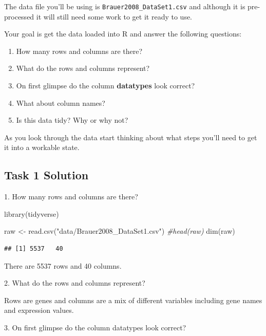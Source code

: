 \documentclass[
]{book}
\newenvironment{Shaded}{\begin{snugshade}}{\end{snugshade}}
\newcommand{\CommentTok}[1]{\textcolor[rgb]{0.56,0.35,0.01}{\textit{#1}}}
\newcommand{\FunctionTok}[1]{\textcolor[rgb]{0.00,0.00,0.00}{#1}}
\newcommand{\NormalTok}[1]{#1}
\newcommand{\OtherTok}[1]{\textcolor[rgb]{0.56,0.35,0.01}{#1}}
\newcommand{\StringTok}[1]{\textcolor[rgb]{0.31,0.60,0.02}{#1}}
\providecommand{\tightlist}{%
  \setlength{\itemsep}{0pt}\setlength{\parskip}{0pt}}
\begin{document}
The data file you'll be using is \texttt{Brauer2008\_DataSet1.csv} and although it is pre-processed it will still need some work to get it ready to use.

Your goal is get the data loaded into R and answer the following questions:

\begin{enumerate}
\def\labelenumi{\arabic{enumi}.}
\tightlist
\item
  How many rows and columns are there?
\item
  What do the rows and columns represent?
\item
  On first glimpse do the column \textbf{datatypes} look correct?
\item
  What about column names?
\item
  Is this data tidy? Why or why not?
\end{enumerate}

As you look through the data start thinking about what steps you'll need to get it into a workable state.

\hypertarget{task-1-solution}{%
\subsection*{Task 1 Solution}\label{task-1-solution}}

1. How many rows and columns are there?

\begin{Shaded}
\begin{Highlighting}[]
\FunctionTok{library}\NormalTok{(tidyverse)}

\NormalTok{raw }\OtherTok{\textless{}{-}} \FunctionTok{read.csv}\NormalTok{(}\StringTok{"data/Brauer2008\_DataSet1.csv"}\NormalTok{)}
\CommentTok{\#head(raw)}
\FunctionTok{dim}\NormalTok{(raw)}
\end{Highlighting}
\end{Shaded}

\begin{verbatim}
## [1] 5537   40
\end{verbatim}

There are 5537 rows and 40 columns.

2. What do the rows and columns represent?

Rows are genes and columns are a mix of different variables including gene names and expression values.

3. On first glimpse do the column datatypes look correct?
\end{document}
